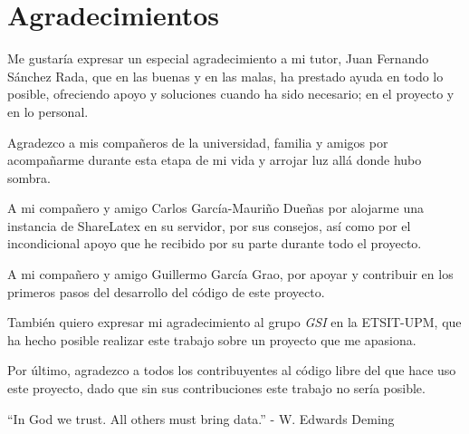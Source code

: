 \cleardoublepage
{}
\chapter*{Agradecimientos}

Me gustaría expresar un especial agradecimiento a mi tutor, Juan Fernando Sánchez Rada, que en las buenas y en las malas, ha prestado ayuda en todo lo posible, ofreciendo apoyo y soluciones cuando ha sido necesario; en el proyecto y en lo personal.

Agradezco a mis compañeros de la universidad, familia y amigos por acompañarme durante esta etapa de mi vida y arrojar luz allá donde hubo sombra.

A mi compañero y amigo Carlos García-Mauriño Dueñas por alojarme una instancia de ShareLatex en su servidor, por sus consejos, así como por el incondicional apoyo que he recibido por su parte durante todo el proyecto.

A mi compañero y amigo Guillermo García Grao, por apoyar y contribuir en los primeros pasos del desarrollo del código de este proyecto.

También quiero expresar mi agradecimiento al grupo {\sl GSI} en la ETSIT-UPM, que ha hecho posible realizar este trabajo sobre un proyecto que me apasiona.

Por último, agradezco a todos los contribuyentes al código libre del que hace uso este proyecto, dado que sin sus contribuciones este trabajo no sería posible.

\begin{flushright}
	``In God we trust. All others must bring data.'' - W. Edwards Deming
\end{flushright}